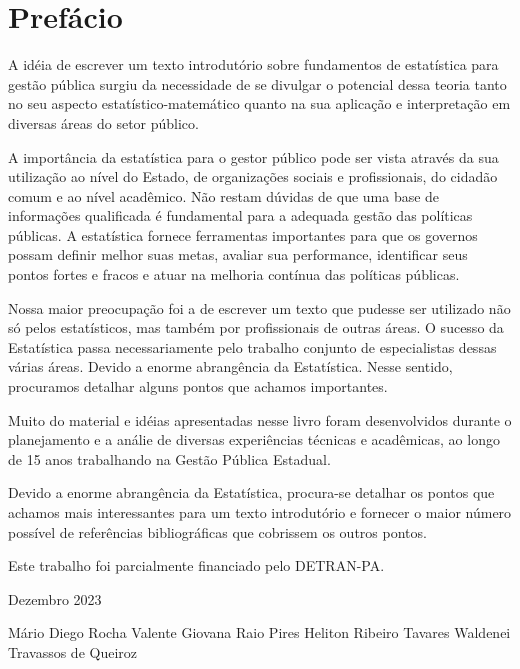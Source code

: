 \chapter*{Prefácio}

\inic A idéia de escrever um texto introdutório sobre fundamentos de estatística para gestão pública surgiu da necessidade de se divulgar o potencial dessa teoria tanto no
seu aspecto estatístico-matemático quanto na sua aplicação e
interpretação em diversas áreas do setor público.\vskip0.3cm



A importância da estatística para o gestor público pode ser vista através da sua
utilização ao nível do Estado, de organizações sociais e profissionais, do cidadão comum e ao nível acadêmico. Não restam dúvidas de que uma base de informações qualificada é fundamental para a adequada gestão das políticas públicas.  A estatística fornece ferramentas importantes para que os governos possam definir melhor suas metas, avaliar sua performance, identificar seus pontos fortes e fracos e atuar na melhoria contínua das políticas públicas.
\vskip0.3cm

Nossa maior preocupação foi a de escrever um texto que pudesse ser
utilizado não só pelos estatísticos, mas também por profissionais de outras áreas. O sucesso da Estatística passa necessariamente
pelo trabalho conjunto de especialistas dessas várias áreas. Devido
a enorme abrangência da Estatística. Nesse sentido, procuramos detalhar
alguns pontos que achamos importantes. \vst

Muito do material e idéias apresentadas nesse livro foram
desenvolvidos durante o planejamento e a análie de diversas experiências técnicas e acadêmicas, ao longo de 15 anos trabalhando na Gestão Pública Estadual.
\vst 

\newpage


Devido a enorme abrangência da Estatística, procura-se detalhar os pontos
que achamos mais interessantes para um texto introdutório e
fornecer o maior número possível de referências bibliográficas que
cobrissem os outros pontos.\vst

Este trabalho foi parcialmente financiado pelo DETRAN-PA.

\vst

\begin{centering}

\vst

Dezembro 2023 
\vsm

Mário Diego Rocha Valente
Giovana Raio Pires
Heliton Ribeiro Tavares
Waldenei Travassos de Queiroz



\end{centering}

